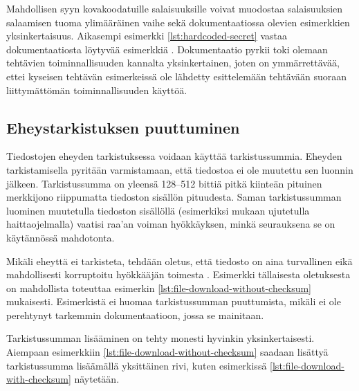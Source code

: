 

Mahdollisen syyn kovakoodatuille salaisuuksille voivat muodostaa salaisuuksien salaamisen
tuoma ylimääräinen vaihe sekä dokumentaatiossa olevien esimerkkien yksinkertaisuus. Aikasempi
esimerkki \ref{lst:hardcoded-secret} vastaa dokumentaatiosta löytyvää esimerkkiä
\parencite{AnsibleDocs}. Dokumentaatio pyrkii toki olemaan tehtävien toiminnallisuuden kannalta
yksinkertainen, joten on ymmärrettävää, ettei kyseisen tehtävän esimerkeissä ole lähdetty
esittelemään tehtävään suoraan liittymättömän toiminnallisuuden käyttöä.

\subsection{Eheystarkistuksen puuttuminen}

Tiedostojen eheyden tarkistuksessa voidaan käyttää tarkistussummia. Eheyden tarkistamisella
pyritään varmistamaan, että tiedostoa ei ole muutettu sen luonnin jälkeen. Tarkistussumma
on yleensä 128–512 bittiä pitkä kiinteän pituinen merkkijono riippumatta tiedoston sisällön
pituudesta. Saman tarkistussumman luominen muutetulla tiedoston sisällöllä (esimerkiksi
mukaan ujutetulla haittaojelmalla) vaatisi raa'an voiman hyökkäyksen, minkä seurauksena se
on käytännössä mahdotonta. \parencite{MeylanAlexandre2020ASot}

Mikäli eheyttä ei tarkisteta, tehdään oletus, että tiedosto on aina turvallinen eikä
mahdollisesti korruptoitu hyökkääjän toimesta \parencite{RahmanAkond2021SSiA}. Esimerkki
tällaisesta oletuksesta on mahdollista toteuttaa esimerkin
\ref{lst:file-download-without-checksum} mukaisesti. Esimerkistä ei huomaa tarkistussumman
puuttumista, mikäli ei ole perehtynyt tarkemmin dokumentaatioon, jossa se mainitaan.



Tarkistussumman lisääminen on tehty monesti hyvinkin yksinkertaisesti. Aiempaan esimerkkiin
\ref{lst:file-download-without-checksum} saadaan lisättyä tarkistussumma lisäämällä
yksittäinen rivi, kuten esimerkissä \ref{lst:file-download-with-checksum} näytetään.



